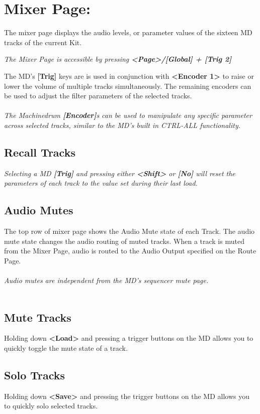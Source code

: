 \chapter{Mixer Page:}
The mixer page displays the audio levels, or parameter values of the sixteen MD tracks of the current Kit.

\textit{The Mixer Page is accessible by pressing \textbf{<Page>/[Global] + [Trig 2]}}


The MD's \textbf{[Trig]} keys are is used in conjunction with \textbf{<Encoder 1>} to raise or lower the volume of multiple tracks simultaneously. The remaining encoders can be used to adjust the filter parameters of the selected tracks.\\\\
\textit{The Machinedrum \textbf{[Encoder]}s can be used to manipulate any specific parameter across selected tracks, similar to the MD's built in CTRL-ALL functionality.}
\section{Recall Tracks}
\textit{Selecting a MD \textbf{[Trig]} and pressing either \textbf{<Shift>} or \textbf{[No]} will reset the parameters of each track to the value set during their last load.}
\section{Audio Mutes}
The top row of mixer page shows the Audio Mute state of each Track. The audio mute state changes the audio routing of muted tracks. When a track is muted from the Mixer Page, audio is routed to the Audio Output specified on the Route Page.\\
\\
\textit{Audio mutes are independent from the MD's sequencer mute page.}
\\\\
\section{Mute Tracks}
Holding down \textbf{<Load>} and pressing a trigger buttons on the MD allows you to quickly toggle the mute state of a track.
\section{Solo Tracks}
Holding down \textbf{<Save>} and pressing the trigger buttons on the MD allows you to quickly solo selected tracks.\\\\

